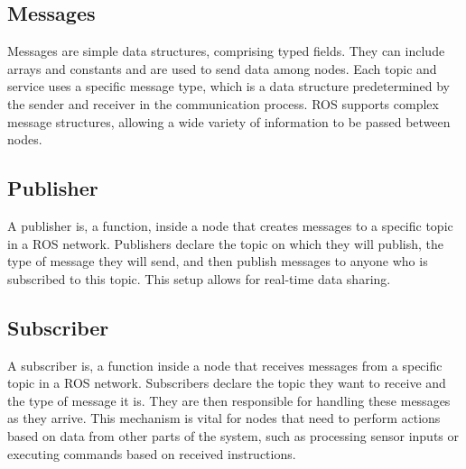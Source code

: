 \documentclass{article}
\begin{document}
	\subsection{Messages}
	Messages are simple data structures, comprising typed fields. They can include arrays and constants and are used to send data among nodes. Each topic and service uses a specific message type, which is a data structure predetermined by the sender and receiver in the communication process. ROS supports complex message structures, allowing a wide variety of information to be passed between nodes.
	
	\subsection{Publisher}
	A publisher is, a function, inside a node that creates messages to a specific topic in a ROS network. Publishers declare the topic on which they will publish, the type of message they will send, and then publish messages to anyone who is subscribed to this topic. This setup allows for real-time data sharing.
	
	\subsection{Subscriber}
	A subscriber is, a function inside a node that receives messages from a specific topic in a ROS network. Subscribers declare the topic they want to receive and the type of message it is. They are then responsible for handling these messages as they arrive. This mechanism is vital for nodes that need to perform actions based on data from other parts of the system, such as processing sensor inputs or executing commands based on received instructions.
	
\end{document}
